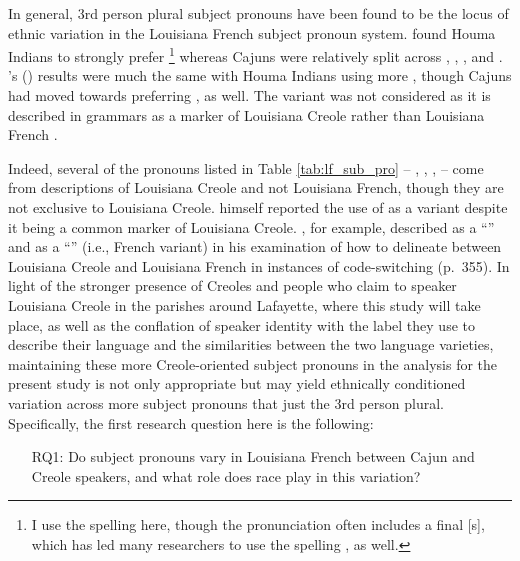       In general, 3rd person plural subject pronouns have been found to be the locus of ethnic variation in the Louisiana French subject pronoun system.
      \textcite{rottet_language_1995} found Houma Indians to strongly prefer \footnote{
        I use the spelling  here, though the pronunciation often includes a final [s], which has led many researchers to use the spelling , as well.
      } whereas Cajuns were relatively split across , , , and .
      \citeauthor{dajko_ethnic_2009}'s (\citeyear{dajko_ethnic_2009}) results were much the same with Houma Indians using more , though Cajuns had moved towards preferring , as well.
      The variant  was not considered as it is described in grammars as a marker of Louisiana Creole rather than Louisiana French \parencite{klingler_if_2003, neumann_creole_1985}.

      Indeed, several of the pronouns listed in Table \ref{tab:lf_sub_pro} -- , , ,  -- come from descriptions of Louisiana Creole and not Louisiana French, though they are not exclusive to Louisiana Creole.
      \textcite{rottet_language_1995} himself reported the use of  as a variant despite it being a common marker of Louisiana Creole.
      \textcite{klingler_probleme_2005}, for example, described  as a ``''  and  as a ``''  (i.e., French variant) in his examination of how to delineate between Louisiana Creole and Louisiana French in instances of code-switching (p.~355).
      In light of the stronger presence of Creoles and people who claim to speaker Louisiana Creole in the parishes around Lafayette, where this study will take place, as well as the conflation of speaker identity with the label they use to describe their language and the similarities between the two language varieties, maintaining these more Creole-oriented subject pronouns in the analysis for the present study is not only appropriate but may yield ethnically conditioned variation across more subject pronouns that just the 3rd person plural.
      Specifically, the first research question here is the following:
      \begin{itemize}
        \item[RQ1:] Do subject pronouns vary in Louisiana French between Cajun and Creole speakers, and what role does race play in this variation?
      \end{itemize}

